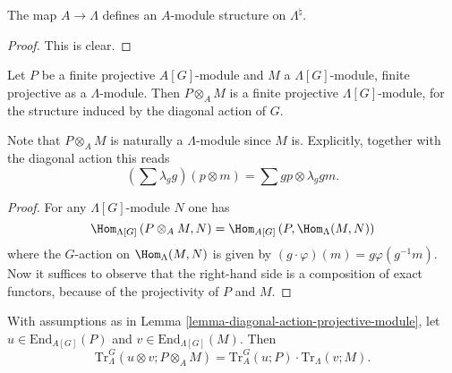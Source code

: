 \begin{lemma}
\label{lemma-A-module-structure}
The map $A\to \Lambda$ defines an $A$-module structure on $\Lambda^\natural$.
\end{lemma}

\begin{proof}
This is clear.
\end{proof}

\begin{lemma}
\label{lemma-diagonal-action-projective-module}
Let $P$ be a finite projective $A[G]$-module and $M$ a $\Lambda[G]$-module,
finite projective as a $\Lambda$-module. Then $P \otimes_A M$ is a finite
projective $\Lambda[G]$-module, for the structure induced by the diagonal
action of $G$.
\end{lemma}

\noindent
Note that $P \otimes_A M$ is naturally a $\Lambda$-module since $M$ is.
Explicitly, together with the diagonal action this reads
$$
\left(\sum\lambda_g g\right)\left(p \otimes m\right)
=
\sum g p \otimes \lambda_g g m.
$$

\begin{proof}
For any $\Lambda[G]$-module $N$ one has
$$
\Hom_{\Lambda[G]}\left(P \otimes_A M, N\right)= \Hom_{A[G]}\left(P,
\Hom_{\Lambda}(M, N)\right)
$$
where the $G$-action on $\Hom_{\Lambda}(M, N)$ is given by $(g\cdot
\varphi)(m) = g \varphi (g^{-1} m) $. Now it suffices to observe that the
right-hand side is a composition of exact functors, because of the projectivity
of $P$ and $M$.
\end{proof}

\begin{lemma}
\label{lemma-multiplicative-trace}
With assumptions as in
Lemma \ref{lemma-diagonal-action-projective-module},
let
$u\in \text{End}_{A[G]}(P)$ and $v\in \text{End}_{\Lambda[G]}(M)$. Then
$$
\text{Tr}_\Lambda^G \left(u \otimes v; P \otimes_A M\right) = \text{Tr}_A^G(u;
P)\cdot \text{Tr}_\Lambda(v;M).
$$
\end{lemma}


